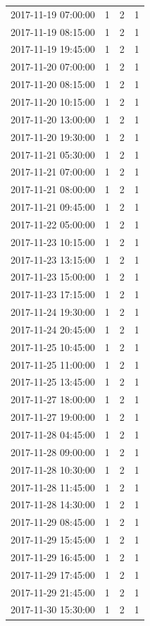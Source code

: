\begin{tabular}{lrrr}
2017-11-19 07:00:00 & 1 & 2 & 1 \\
2017-11-19 08:15:00 & 1 & 2 & 1 \\
2017-11-19 19:45:00 & 1 & 2 & 1 \\
2017-11-20 07:00:00 & 1 & 2 & 1 \\
2017-11-20 08:15:00 & 1 & 2 & 1 \\
2017-11-20 10:15:00 & 1 & 2 & 1 \\
2017-11-20 13:00:00 & 1 & 2 & 1 \\
2017-11-20 19:30:00 & 1 & 2 & 1 \\
2017-11-21 05:30:00 & 1 & 2 & 1 \\
2017-11-21 07:00:00 & 1 & 2 & 1 \\
2017-11-21 08:00:00 & 1 & 2 & 1 \\
2017-11-21 09:45:00 & 1 & 2 & 1 \\
2017-11-22 05:00:00 & 1 & 2 & 1 \\
2017-11-23 10:15:00 & 1 & 2 & 1 \\
2017-11-23 13:15:00 & 1 & 2 & 1 \\
2017-11-23 15:00:00 & 1 & 2 & 1 \\
2017-11-23 17:15:00 & 1 & 2 & 1 \\
2017-11-24 19:30:00 & 1 & 2 & 1 \\
2017-11-24 20:45:00 & 1 & 2 & 1 \\
2017-11-25 10:45:00 & 1 & 2 & 1 \\
2017-11-25 11:00:00 & 1 & 2 & 1 \\
2017-11-25 13:45:00 & 1 & 2 & 1 \\
2017-11-27 18:00:00 & 1 & 2 & 1 \\
2017-11-27 19:00:00 & 1 & 2 & 1 \\
2017-11-28 04:45:00 & 1 & 2 & 1 \\
2017-11-28 09:00:00 & 1 & 2 & 1 \\
2017-11-28 10:30:00 & 1 & 2 & 1 \\
2017-11-28 11:45:00 & 1 & 2 & 1 \\
2017-11-28 14:30:00 & 1 & 2 & 1 \\
2017-11-29 08:45:00 & 1 & 2 & 1 \\
2017-11-29 15:45:00 & 1 & 2 & 1 \\
2017-11-29 16:45:00 & 1 & 2 & 1 \\
2017-11-29 17:45:00 & 1 & 2 & 1 \\
2017-11-29 21:45:00 & 1 & 2 & 1 \\
2017-11-30 15:30:00 & 1 & 2 & 1 \\

\end{tabular}
